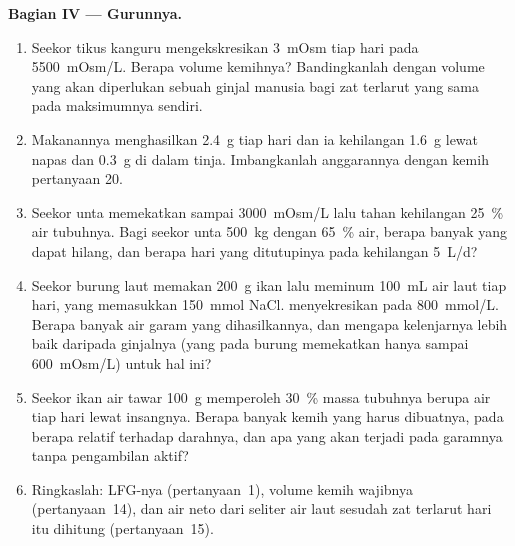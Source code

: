 \begin{problem}
\medskip
\noindent\textbf{Bagian IV --- Gurunnya.}
\begin{enumerate}[resume]
  \item Seekor tikus kanguru mengekskresikan \qty{3}{mOsm} tiap hari pada \qty{5500}{mOsm/L}.
        Berapa volume kemihnya? Bandingkanlah dengan volume yang akan diperlukan
        sebuah ginjal manusia bagi zat terlarut yang sama pada maksimumnya sendiri.
  \item Makanannya menghasilkan \qty{2.4}{g}  tiap hari dan ia
        kehilangan \qty{1.6}{g} lewat napas dan \qty{0.3}{g} di dalam tinja.
        Imbangkanlah anggarannya dengan kemih pertanyaan 20.
  \item Seekor unta memekatkan sampai \qty{3000}{mOsm/L} lalu tahan kehilangan
        \qty{25}{\%} air tubuhnya. Bagi seekor unta \qty{500}{kg} dengan
        \qty{65}{\%} air, berapa banyak yang dapat hilang, dan berapa hari yang
        ditutupinya pada kehilangan \qty{5}{L/d}?
  \item Seekor burung laut memakan \qty{200}{g} ikan lalu meminum \qty{100}{mL}
        air laut tiap hari, yang memasukkan \qty{150}{mmol} NaCl. 
        menyekresikan pada \qty{800}{mmol/L}. Berapa banyak air garam yang
        dihasilkannya, dan mengapa kelenjarnya lebih baik daripada ginjalnya (yang pada
        burung memekatkan hanya sampai \qty{600}{mOsm/L}) untuk hal ini?
  \item Seekor ikan air tawar \qty{100}{g} memperoleh \qty{30}{\%} massa tubuhnya
        berupa air tiap hari lewat insangnya. Berapa banyak kemih yang harus
        dibuatnya, pada  berapa relatif terhadap darahnya, dan apa yang akan
        terjadi pada garamnya tanpa pengambilan aktif?
  \item Ringkaslah: LFG-nya (pertanyaan~1), volume kemih wajibnya
        (pertanyaan~14), dan air neto dari seliter air laut sesudah
        zat terlarut hari itu dihitung (pertanyaan~15).
\end{enumerate}
\end{problem}
